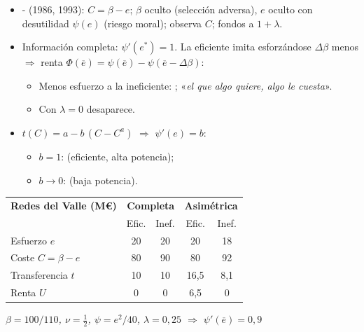\documentclass{article}
\begin{document}
\begin{columnas}
\begin{itemize}
\item {}- (1986, 1993): $C=\beta-e$; $\beta$ oculto (selección adversa), $e$ oculto con desutilidad $\psi(e)$ (riesgo moral); observa $C$; fondos a $1+\lambda$.
\item Información completa: $\psi'(e^*)=1$. La eficiente imita esforzándose $\Delta\beta$ menos $\Rightarrow$ renta $\Phi(\overline{e})=\psi(\overline{e})-\psi(\overline{e}-\Delta\beta)$:
  \begin{itemize}
  \item Menos esfuerzo a la ineficiente: ; «\emph{el que algo quiere, algo le cuesta}».
  \item Con $\lambda=0$ desaparece.
  \end{itemize}
\item {} $t(C)=a-b\,(C-C^a)$ $\Rightarrow$ $\psi'(e)=b$:
  \begin{itemize}
  \item $b=1$:  (eficiente, alta potencia);
  \item $b\to0$:  (baja potencia).
  \end{itemize}
\end{itemize}
{\centering\small\renewcommand{\arraystretch}{1.05}\setlength{\tabcolsep}{3pt}%
\begin{tabular}{@{}lcccc@{}}
\toprule
\rowcolor{tceeazulpalido}\textbf{Redes del Valle (M€)} & \multicolumn{2}{c}{\textbf{Completa}} & \multicolumn{2}{c}{\textbf{Asimétrica}}\\
\rowcolor{tceeazulpalido} & Efic. & Inef. & Efic. & Inef.\\
\midrule
Esfuerzo $e$ & 20 & 20 & 20 & \textcolor{tceerojo}{18}\\
Coste $C=\beta-e$ & 80 & 90 & 80 & \textcolor{tceerojo}{92}\\
Transferencia $t$ & 10 & 10 & 16,5 & 8,1\\
Renta $U$ & 0 & 0 & \textcolor{tceerojo}{6,5} & 0\\
\bottomrule
\end{tabular}\par}
{\centering\scriptsize\color{tceegris}\itshape $\beta=100/110$, $\nu=\tfrac12$, $\psi=e^2/40$, $\lambda=0{,}25$ $\Rightarrow$ $\psi'(\overline{e})=0{,}9$\par}

\end{columnas}
\end{document}

